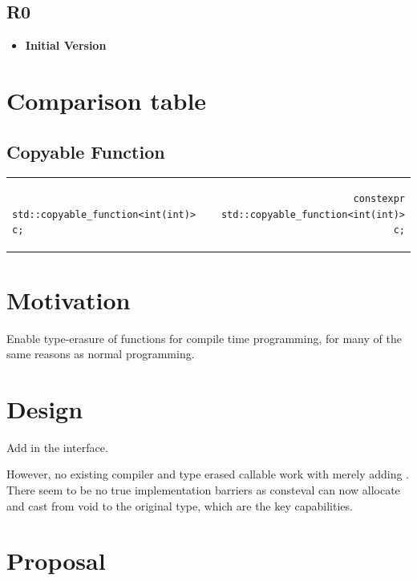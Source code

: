 \documentclass[a4paper,10pt,oneside,openany,final,article]{memoir}
\begin{document}
\section*{R0}

\begin{itemize}
\item \textbf{Initial Version}
\end{itemize}

\chapter{Comparison table}
\section{Copyable Function}

\begin{tabular}{ lr }
  \begin{minipage}[t]{0.45\columnwidth}
    \begin{verbatim}
      std::copyable_function<int(int)> c;
    \end{verbatim}
  \end{minipage}
  &
    \begin{minipage}[t]{0.45\columnwidth}
      \begin{verbatim}
      constexpr std::copyable_function<int(int)> c;

      \end{verbatim}
    \end{minipage}
\end{tabular}


\chapter{Motivation}
Enable type-erasure of functions for compile time programming, for many of the same reasons as normal programming.

\chapter{Design}
Add  in the interface.

However, no existing compiler and type erased callable work with merely adding . There seem to be no true implementation barriers as consteval can now allocate and cast from void to the original type, which are the key capabilities.


\chapter{Proposal}
\end{document}
